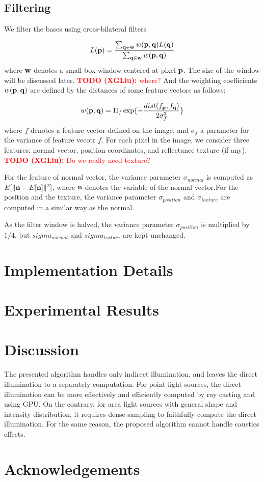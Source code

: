 \documentclass[review]{acmsiggraph}
\newcommand{\bfp}{{\bf p}}
\newcommand{\bfq}{{\bf q}}
\newcommand{\XGTODO}[1]{\textcolor{red}{{\bf TODO (XGLiu):} #1}}
\newcommand{\Equation}[1]{
	\begin{equation}
		#1
	\end{equation}
}
\begin{document}
\subsection{Filtering}

We filter the bases using cross-bilateral filters

\Equation{\nonumber
	L(\bfp)=\frac{\sum_{\bfq \in {\bf w}}w(\bfp,\bfq)L(\bfq)}
	{\sum_{\bfq \in {\bf w}}w(\bfp,\bfq)}
}%
where $\bf w$ denotes a small box window centered at pixel $\bfp$. The size of the window will be discussed later. \XGTODO{where?} And the weighting coefficients $w(\bfp,\bfq)$ are defined by the distances of some feature vectors as follows:
\Equation{\nonumber
	w(\bfp,\bfq)=\Pi_{f}\exp\{-\frac{dist(f_\bfp,f_\bfq)}{2\sigma_f^2}\} 
}%
where $f$ denotes a feature vector defined on the image, and $\sigma_f$ a parameter for the variance of feature vecotr $f$. For each pixel in the image, we consider three features: normal vector, position coordinates, and reflectance texture (if any). \XGTODO{Do we really need texture?}

For the feature of normal vector, the variance parameter $\sigma_{normal}$ is computed as $E[\|{\bf n}-E[{\bf n}] \|^2]$, where $\bf n$ denotes the variable of the normal vector.For the position and the texture, the variance parameter $\sigma_{position}$ and $\sigma_{texture}$ are computed in a similar way as the normal. 

As the filter window is halved, the variance parameter $\sigma_{position}$ is multiplied by $1/4$, but $sigma_{normal}$ and $sigma_{texture}$ are kept unchanged.

\section{Implementation Details}

\section{Experimental Results}

\section{Discussion}

The presented algorithm handles only indirect illumination, and leaves the direct illumination to a separately computation. For point light sources, the direct illumination can be more effectively and efficiently computed by ray casting and using GPU. On the contrary, for area light sources with general shape and intensity distribution, it requires dense sampling to faithfully compute the direct illumination. For the same reason, the proposed algorithm cannot handle caustics effects.

\section*{Acknowledgements}


\nocite{*}

\end{document}
